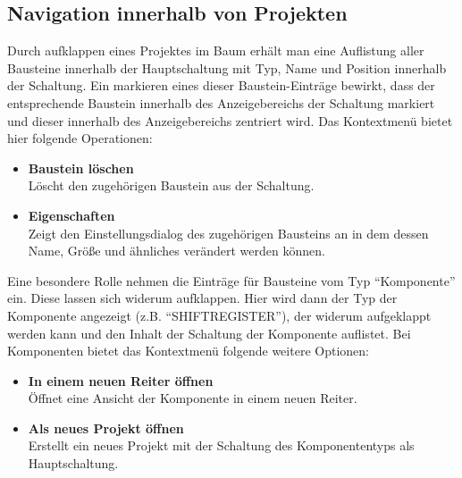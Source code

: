 \documentclass[12pt,a4paper]{scrartcl}
\begin{document}
\subsection{Navigation innerhalb von Projekten}
Durch aufklappen eines Projektes im Baum erhält man eine Auflistung aller Bausteine innerhalb der Hauptschaltung mit Typ, Name und Position innerhalb der Schaltung. Ein markieren eines dieser Baustein-Einträge bewirkt, dass der entsprechende Baustein innerhalb des Anzeigebereichs der Schaltung markiert und dieser innerhalb des Anzeigebereichs zentriert wird. Das Kontextmenü bietet hier folgende Operationen:
\begin{itemize}
	\item \textbf{Baustein löschen} \\
		Löscht den zugehörigen Baustein aus der Schaltung.
	\item \textbf{Eigenschaften} \\
		Zeigt den Einstellungsdialog des zugehörigen Bausteins an in dem dessen Name, Größe und ähnliches verändert werden können.
\end{itemize}
\noindent Eine besondere Rolle nehmen die Einträge für Bausteine vom Typ ``Komponente'' ein. Diese lassen sich widerum aufklappen. Hier wird dann der Typ der Komponente angezeigt (z.B. ``SHIFTREGISTER''), der widerum aufgeklappt werden kann und den Inhalt der \gls{Schaltung} der Komponente auflistet. Bei Komponenten bietet das Kontextmenü folgende weitere Optionen:
\begin{itemize}
	\item \textbf{In einem neuen Reiter öffnen} \\
		Öffnet eine Ansicht der Komponente in einem neuen Reiter.
	\item \textbf{Als neues Projekt öffnen} \\
		Erstellt ein neues Projekt mit der Schaltung des Komponententyps als Hauptschaltung.
\end{itemize}
\end{document}

